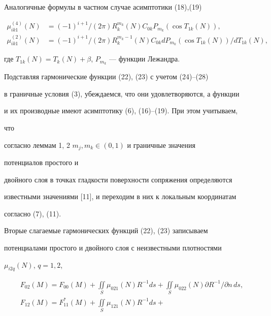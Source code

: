 \begin{pf}
 


Аналогичные формулы в частном случае асимптотики (18),(19) 


\begin{align*} 


\mu^{(4)}_{i k1}(N)&=(-1)^{i+1}/(2\pi)R^{m_k}_k(N)C_{0k} 


P_{m_k}(\cos T_{1k}(N)),\\ 


\mu^{(2)}_{i k1}(N)&=(-1)^{i+1}/(2\pi)R^{m_k-1}_k 


(N) C_{0k}d P_{m_k}(\cos T_{1k}(N))/d T_{1k}(N), 


\end{align*} 


где $T_{1k}(N)=T_k(N)+\beta$, $P_{m_k}$ --- функции Лежандра. 


 


Подставляя гармонические функции (22), (23) с учетом (24)--(28)  


в граничные условия (3), убеждаемся, что они удовлетворяются, а функции  


и их производные имеют асимптотику (6), (16)--(19). При этом учитываем, 


что  


согласно леммам 1, 2\; $m_j,m_k\in(0,1)$ и граничные значения 


потенциалов простого и 


двойного слоя в точках гладкости поверхности сопряжения определяются  


известными значениями [11], и переходим в них к локальным координатам  


согласно (7), (11). 


 


Вторые слагаемые гармонических функций (22), (23) записываем  


потенциалами простого и двойного слоя с неизвестными плотностями 


$\mu_{i2q}(N)$, $q=1,2$, 


\begin{gather} 


F_{02}(M)=F_{00}(M)+\iint\limits_S \mu_{021}(N)R^{-1}d s+ 


\iint\limits_S \mu_{022}(N)\partial R^{-1}/ 


\partial n\, d s,\\ 


F_{12}(M)=F^*_{11}(M)+\iint\limits_S \mu_{121}(N)R^{-1}d s+ 



\end{gather}
\end{pf}
